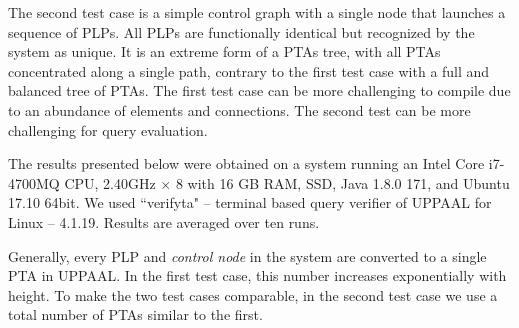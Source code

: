 \documentclass[letterpaper]{article}
\newcommand{\frameImage}[4]{
\begin{figure}[H] 
  \centerline{
    \fcolorbox{frameColor}{white}{
        \texttt{[image: \#1]} } }
    \caption{#4}
    \label{fig:#1}
\end{figure}
}
\begin{document}
The second test case  is a  simple control graph with a single node that launches a sequence of PLPs. All PLPs are functionally identical but recognized by the system as unique. 
It is an extreme form of a PTAs tree, with all PTAs concentrated along a single path, contrary to the first test case with a full and balanced tree of PTAs. The first test case can be more challenging to compile due to an abundance of elements and connections. The second test can be more challenging for query evaluation. 

The results presented below were obtained on a system running an Intel Core i7-4700MQ CPU, 2.40GHz $\times$ 8 with 16 GB RAM, SSD, Java 1.8.0 171, and Ubuntu 17.10 64bit. We used 
``verifyta" -- terminal based query verifier of UPPAAL for Linux -- 4.1.19. Results are averaged over ten runs. 

Generally, every PLP and {\em control node} in the system are converted to a single PTA in UPPAAL. In the first test case, this number increases exponentially with height.  To make the two test cases comparable, in the second test case we use a total number of PTAs similar to the first. 


\end{document}
